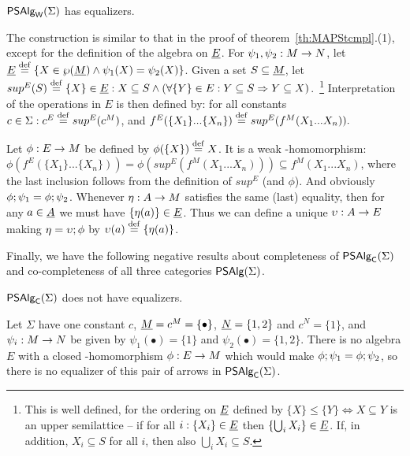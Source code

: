 \documentclass[10pt]{article}
\begin{document}
\begin{Fact}
$\mbox{\sf PSAlg}_{\sf W}(\Sigma)$ has equalizers.
\end{Fact}

\begin{Proof}
The construction is similar to that in the proof of
theorem~\ref{th:MAPStcmpl}.(1), except for the definition of the
algebra on $\underline {E}$.  For $\psi_1,\psi_2:M\rightarrow N$, let $\underline {E}\stackrel{{\rm \tiny{def}}}= \{X\in\wp(\underline {M})\land\psi_1(X)=\psi_2(X)\}$.  Given a set
$S\subseteq\underline {M}$, let $sup^E(S)\stackrel{{\rm \tiny{def}}}= \{X\}\in\underline {E} : X\subseteq
S\land (\forall \{Y\}\in E: Y\subseteq S\Rightarrow Y\subseteq
X)$.~\footnote{This is well defined, for the ordering on $\underline {E}$
defined by $\{X\}\leq\{Y\}\iff X\subseteq Y$ is an upper semilattice
-- if for all $i: \{X_i\}\in\underline {E}$ then $\{\bigcup_i X_i\}\in\underline {E}$.  If, in addition, $X_i\subseteq S$ for all $i$, then also
$\bigcup_i X_i\subseteq S$.}  Interpretation of the operations in $E$
is then defined by: for all constants $c\in\Sigma: c^E\stackrel{{\rm \tiny{def}}}=
sup^E(c^M)$, and $f^E(\{X_1\}...\{X_n\}) \stackrel{{\rm \tiny{def}}}= sup^E(f^M(X_1...X_n)).$


Let $\phi:E\rightarrow M$ be defined by $\phi(\{X\})\stackrel{{\rm \tiny{def}}}= X$. It is a weak
\PS-homomorphism: $\phi(f^E(\{X_1\}...\{X_n\})) =
\phi(sup^E(f^M(X_1...X_n))) \subseteq f^M(X_1...X_n)$, where the last
inclusion follows from the definition of $sup^E$ (and $\phi$).  And
obviously $\phi;\psi_1=\phi;\psi_2$.  Whenever
$\eta:A\rightarrow M$ satisfies the same (last) equality, then for any
$a\in\underline {A}$ we must have $\{\eta(a)\}\in\underline {E}$. Thus we can
define a unique $\upsilon:A\rightarrow E$ making $\eta=\upsilon;\phi$ by
$\upsilon(a)\stackrel{{\rm \tiny{def}}}=\{\eta(a)\}$.
\end{Proof}

\noindent
Finally, we have the following negative results about completeness of
$\mbox{\sf PSAlg}_{\sf C}(\Sigma)$ and co-completeness of all three categories $\mbox{\sf PSAlg}(\Sigma)$.

\begin{Fact}
$\mbox{\sf PSAlg}_{\sf C}(\Sigma)$ does not have equalizers.
\end{Fact}

\begin{Proof}
Let $\Sigma$ have one constant $c$, $\underline {M}=c^M=\{\bullet\}$,
$\underline {N}=\{1,2\}$ and $c^N=\{1\}$, and $\psi_i:M\rightarrow N$ be given by
$\psi_1(\bullet)=\{1\}$ and $\psi_2(\bullet)=\{1,2\}$. There is no
algebra $E$ with a closed \PS-homomorphism $\phi:E\rightarrow M$ which would
make $\phi;\psi_1=\phi;\psi_2$, so there is no equalizer
of this pair of arrows in $\mbox{\sf PSAlg}_{\sf C}(\Sigma)$.
\end{Proof}
\end{document}
